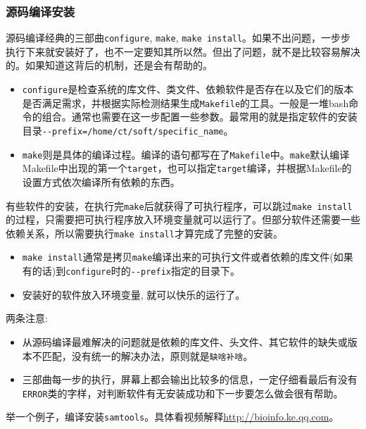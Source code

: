 \documentclass[]{article}
\numberwithin{figure}{section}
\numberwithin{table}{section}
\begin{document}
\hypertarget{configure_make_install}{%
\subsubsection{源码编译安装}\label{configure_make_install}}

源码编译经典的三部曲\texttt{configure}, \texttt{make}, \texttt{make\ install}。如果不出问题，一步步执行下来就安装好了，也不一定要知其所以然。但出了问题，就不是比较容易解决的。如果知道这背后的机制，还是会有帮助的。

\begin{itemize}
\item
  \texttt{configure}是检查系统的库文件、类文件、依赖软件是否存在以及它们的版本是否满足需求，并根据实际检测结果生成\texttt{Makefile}的工具。一般是一堆bash命令的组合。通常也需要在这一步配置一些参数。最常用的就是指定软件的安装目录\texttt{-\/-prefix=/home/ct/soft/specific\_name}。
\item
  \texttt{make}则是具体的编译过程。编译的语句都写在了\texttt{Makefile}中。\texttt{make}默认编译Makefile中出现的第一个\texttt{target}，也可以指定\texttt{target}编译，并根据Makefile的设置方式依次编译所有依赖的东西。
\end{itemize}

有些软件的安装，在执行完\texttt{make}后就获得了可执行程序，可以跳过\texttt{make\ install}的过程，只需要把可执行程序放入环境变量就可以运行了。但部分软件还需要一些依赖关系，所以需要执行\texttt{make\ install}才算完成了完整的安装。

\begin{itemize}
\item
  \texttt{make\ install}通常是拷贝\texttt{make}编译出来的可执行文件或者依赖的库文件(如果有的话)到\texttt{configure}时的\texttt{-\/-prefix}指定的目录下。
\item
  安装好的软件放入环境变量, 就可以快乐的运行了。
\end{itemize}

两条注意:

\begin{itemize}
\item
  从源码编译最难解决的问题就是依赖的库文件、头文件、其它软件的缺失或版本不匹配，没有统一的解决办法，原则就是\texttt{缺啥补啥}。
\item
  三部曲每一步的执行，屏幕上都会输出比较多的信息，一定仔细看最后有没有\texttt{ERROR}类的字样，对判断软件有无安装成功和下一步要怎么做会很有帮助。
\end{itemize}

举一个例子，编译安装\texttt{samtools}。具体看视频解释\url{http://bioinfo.ke.qq.com}。
\end{document}
